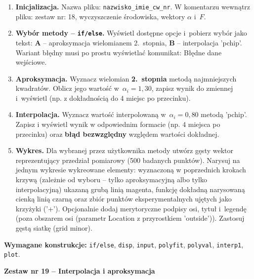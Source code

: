 \documentclass[a4paper,11pt]{article}
\begin{document}
\begin{enumerate}[leftmargin=*, label=\textbf{\arabic*.}, itemsep=2pt]

  \item \textbf{Inicjalizacja.}
    Nazwa pliku: \texttt{nazwisko\_imie\_cw\_nr}. W komentarzu wewnątrz pliku: zestaw nr: 18, wyczyszczenie środowiska, wektory $\alpha$ i~$F$.

  \item \textbf{Wybór metody -- \texttt{if/else}.}
    Wyświetl dostępne opcje i~pobierz wybór jako tekst: \textbf{A} -- aproksymacja wielomianem 2.~stopnia, \textbf{B} -- interpolacja 'pchip'. Wariant błędny musi po prostu wyświetlać komunikat: Błędne dane wejściowe.

  \item \textbf{Aproksymacja.}
    Wyznacz wielomian \textbf{2.~stopnia} metodą najmniejszych kwadratów. Oblicz jego wartość w~$\alpha_i = 1{,}30$, zapisz wynik do zmiennej i~wyświetl (np. z dokładnością do 4 miejsc po przecinku).

  \item \textbf{Interpolacja.}
    Wyznacz wartość interpolowaną w~$\alpha_i = 0{,}80$ metodą 'pchip'. Zapisz i wyświetl wynik w odpowiednim formacie (np. 4 miejsca po przecinku) oraz \textbf{błąd bezwzględny} względem wartości dokładnej.

  \item \textbf{Wykres.}
    Dla wybranej przez użytkownika metody utwórz gęsty wektor reprezentujący przedział pomiarowy (500 badanych punktów). Narysuj na jednym wykresie wykreowane elementy: wyznaczoną w poprzednich krokach krzywą (zależnie od wyboru -- tylko aproksymacyjną albo tylko interpolacyjną) ukazaną grubą linią magenta, funkcję dokładną narysowaną cienką linią czarną oraz zbiór punktów eksperymentalnych ujętych jako krzyżyki ('+'). Opcjonalnie dodaj merytoryczne podpisy osi, tytuł i~legendę (poza obszarem osi (parametr Location z przyrostkiem 'outside')). Zastosuj gęstą siatkę (grid minor).

\end{enumerate}

\vspace{0.3cm}
\begin{ramka}
\textbf{Wymagane konstrukcje:}
\texttt{if/else}, \texttt{disp}, \texttt{input}, \texttt{polyfit}, \texttt{polyval}, \texttt{interp1}, \texttt{plot}.
\end{ramka}

\clearpage
\begin{center}
  {\large\bfseries Zestaw nr 19 \quad -- \quad Interpolacja i aproksymacja}
\end{center}
\hrulefill
\vspace{0.4cm}
\end{document}
